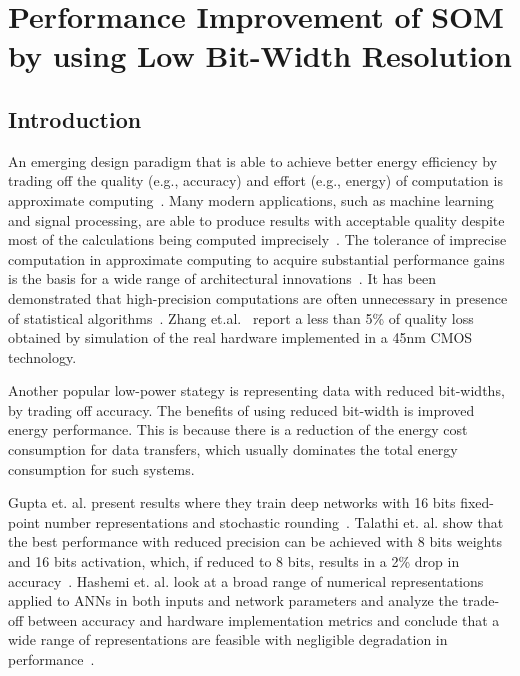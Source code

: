 \documentclass[a4paper,10pt]{article}
\begin{document}
\section{Performance Improvement of SOM by using Low Bit-Width Resolution}
\subsection{Introduction}
An emerging design paradigm that is able to achieve better energy efficiency by trading off the quality (e.g., accuracy) and effort (e.g., energy) of computation is approximate computing~\cite{Zhang2014}. Many modern applications, such as machine learning and signal processing, are able to produce results with acceptable quality despite most of the calculations being computed imprecisely~\cite{Ye2013}. The tolerance of imprecise computation in approximate computing  to acquire substantial performance gains is the basis for a wide range of architectural innovations~\cite{Esmaeilzadeh2012}. It has been demonstrated that high-precision computations are often unnecessary in presence of statistical algorithms~\cite{Moons2017,Zhang2015}. Zhang et.al.~\cite{Zhang2015} report a less than 5\% of quality loss obtained by simulation of the real hardware implemented in a 45nm CMOS technology.

Another popular low-power stategy is representing data with reduced bit-widths, by trading off accuracy. The benefits of using reduced bit-width is improved energy performance. This is because there is a reduction of the energy cost consumption for data transfers, which usually dominates the total energy consumption for such systems.

Gupta et. al. present results where they train deep networks with 16 bits fixed-point number representations and stochastic rounding~\cite{Gupta2015}. Talathi et. al. show that  the best performance with reduced precision  can be  achieved with 8 bits weights and 16 bits activation, which, if reduced to 8 bits, results in a 2\% drop in accuracy~\cite{lin2016overcoming}. Hashemi et. al. look at a broad range of numerical representations applied to ANNs in both inputs and network parameters and analyze the trade-off between accuracy and hardware implementation metrics and conclude that a wide range of representations are feasible with negligible degradation in performance~\cite{Hashemi2017}.
\end{document}
